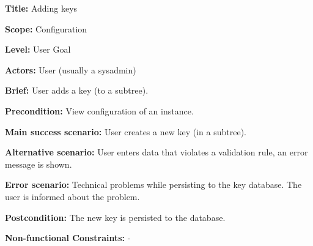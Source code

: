 
\begin{DoxyItemize}
\item {\bfseries Title\+:} Adding keys
\item {\bfseries Scope\+:} Configuration
\item {\bfseries Level\+:} User Goal
\item {\bfseries Actors\+:} User (usually a sysadmin)
\item {\bfseries Brief\+:} User adds a key (to a subtree).
\end{DoxyItemize}


\begin{DoxyItemize}
\item {\bfseries Precondition\+:} View configuration of an instance.
\item {\bfseries Main success scenario\+:} User creates a new key (in a subtree).
\item {\bfseries Alternative scenario\+:} User enters data that violates a validation rule, an error message is shown.
\item {\bfseries Error scenario\+:} Technical problems while persisting to the key database. The user is informed about the problem.
\item {\bfseries Postcondition\+:} The new key is persisted to the database.
\item {\bfseries Non-\/functional Constraints\+:} -\/ 
\end{DoxyItemize}